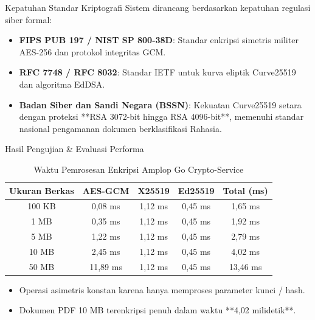 \documentclass{beamer}
\begin{document}
\begin{frame}{Kepatuhan Standar Kriptografi}
  Sistem dirancang berdasarkan kepatuhan regulasi siber formal:
  \vspace{0.2cm}
  \begin{itemize}
    \item \textbf{FIPS PUB 197 / NIST SP 800-38D}: Standar enkripsi simetris militer AES-256 dan protokol integritas GCM.
    \item \textbf{RFC 7748 / RFC 8032}: Standar IETF untuk kurva eliptik Curve25519 dan algoritma EdDSA.
    \item \textbf{Badan Siber dan Sandi Negara (BSSN)}: Kekuatan Curve25519 setara dengan proteksi **RSA 3072-bit hingga RSA 4096-bit**, memenuhi standar nasional pengamanan dokumen berklasifikasi Rahasia.
  \end{itemize}
\end{frame}

\begin{frame}{Hasil Pengujian \& Evaluasi Performa}
  \begin{table}
    \caption{Waktu Pemrosesan Enkripsi Amplop Go Crypto-Service}
    \begin{tabular}{ccccc}
      \toprule
      \textbf{Ukuran Berkas} & \textbf{AES-GCM} & \textbf{X25519} & \textbf{Ed25519} & \textbf{Total (ms)} \\
      \midrule
      100 KB  & 0,08 ms & 1,12 ms & 0,45 ms & 1,65 ms \\
      1 MB    & 0,35 ms & 1,12 ms & 0,45 ms & 1,92 ms \\
      5 MB    & 1,22 ms & 1,12 ms & 0,45 ms & 2,79 ms \\
      10 MB   & 2,45 ms & 1,12 ms & 0,45 ms & 4,02 ms \\
      50 MB   & 11,89 ms & 1,12 ms & 0,45 ms & 13,46 ms \\
      \bottomrule
    \end{tabular}
  \end{table}
  \begin{itemize}
    \item Operasi asimetris konstan karena hanya memproses parameter kunci / hash.
    \item Dokumen PDF 10 MB terenkripsi penuh dalam waktu **4,02 milidetik**.
  \end{itemize}
\end{frame}
\end{document}
